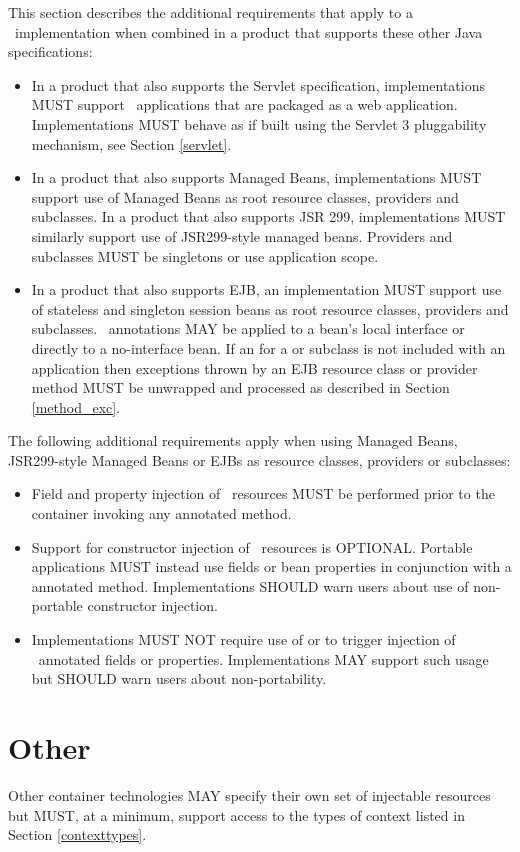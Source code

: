 This section describes the additional requirements that apply to a \jaxrs\ implementation when combined in a product that supports these other Java specifications:

\begin{itemize}
\item In a product that also supports the Servlet specification, implementations MUST support \jaxrs\ applications that are packaged as a web application. Implementations MUST behave as if built using the Servlet 3 pluggability mechanism, see Section \ref{servlet}.
\item In a product that also supports Managed Beans, implementations MUST support use of Managed Beans as root resource classes, providers and  subclasses. In a product that also supports JSR 299, implementations MUST similarly support use of JSR299-style managed beans. Providers and  subclasses MUST be singletons or use application scope.
\item In a product that also supports EJB, an implementation MUST support use of stateless and singleton session beans as root resource classes, providers and  subclasses. \jaxrs\ annotations MAY be applied to a bean's local interface or directly to a no-interface bean. If an  for a  or subclass is not included with an application then exceptions thrown by an EJB resource class or provider method MUST be unwrapped and processed as described in Section \ref{method_exc}.
\end{itemize}

The following additional requirements apply when using Managed Beans, JSR299-style Managed Beans or EJBs as resource classes, providers or  subclasses:

\begin{itemize}
\item Field and property injection of \jaxrs\ resources MUST be performed prior to the container invoking any  annotated method.
\item Support for constructor injection of \jaxrs\ resources is OPTIONAL. Portable applications MUST instead use fields or bean properties in conjunction with a  annotated method. Implementations SHOULD warn users about use of non-portable constructor injection.
\item Implementations MUST NOT require use of  or  to trigger injection of \jaxrs\ annotated fields or properties. Implementations MAY support such usage but SHOULD warn users about non-portability.
\end{itemize}

\section{Other}

Other container technologies MAY specify their own set of injectable resources but MUST, at a minimum, support access to the types of context listed in Section \ref{contexttypes}.
